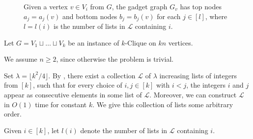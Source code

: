 \documentclass[11pt]{article}
\newcommand{\ca}{\mathcal}
\theoremstyle{definition}
\begin{document}
\begin{figure}[t]
    \caption{
    Given a vertex $v\in V_i$ from $G$, the gadget graph $G_v$ has top nodes $a_j = a_j(v)$ and bottom nodes $b_j = b_j(v)$ for each $j\in [l]$, where $l=l(i)$ is the number of lists in $\ca{L}$ containing  $i$.}
    \label{fig:k-DP-gadget}
\end{figure}

    Let $G = V_1\sqcup \dots \sqcup V_k$ be an instance of \textsf{$k$-Clique} on $kn$ vertices.
    
    We assume $n\ge 2$, since otherwise the problem is trivial.

    Set $\lambda = \lfloor k^2/4\rfloor$.
    By , there exist a collection $\ca{L}$ of $\lambda$ increasing lists of integers from $[k]$, such that for every choice of $i,j\in [k]$ with $i < j$, the integers $i$ and $j$ appear as consecutive elements in some list of $\ca{L}$.
    Moreover, we can construct $\ca{L}$ in $O(1)$ time for constant $k$.
    We give this collection of lists some arbitrary order.
    
    Given $i\in [k]$, let $l(i)$ denote the number of lists in $\ca{L}$ containing $i$.
\end{document}
